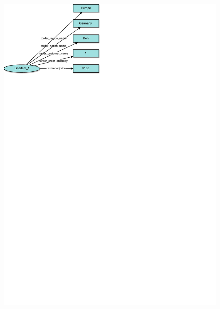 \begin{frame}{\patsec}
\begin{columns}
\begin{figure}
            \includegraphics[trim=0 648 325 0,clip,width=.5\textheight]{images/denormalizedpattern.pdf}
        \end{figure}
    \end{columns}
\end{frame}

